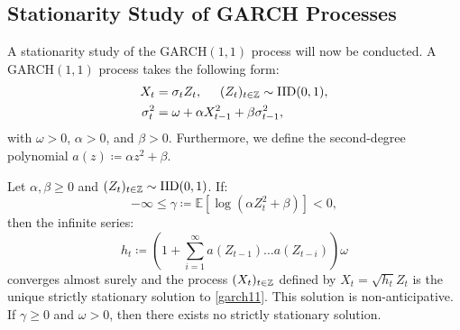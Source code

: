 \subsection{Stationarity Study of GARCH Processes}
A stationarity study of the GARCH$(1,1)$ process will now be conducted. A GARCH$(1,1)$ process takes the following form:
\begin{align}\label{garch11}
\begin{split}
    X_{t}& =\sigma_{t}Z_{t}, \hspace{14 pt} (Z_{t})_{t\in \mathbb{Z}}\sim \mathrm{IID}(0,1),\\
    \sigma_{t}^{2}& = \omega + \alpha X_{t-1}^{2}+\beta\sigma_{t-1}^{2},
\end{split}
\end{align}
with $\omega>0$, $\alpha>0$, and $\beta>0$. Furthermore, we define the second-degree polynomial $a(z)\coloneqq \alpha z^{2}+\beta$.
\begin{thm}\label{lortesatning}
Let $\alpha,\beta\geq 0$ and $(Z_{t})_{t\in \mathbb{Z}}\sim \mathrm{IID}(0,1)$. If:
\begin{equation}
    -\infty\leq \gamma\coloneqq\mathbb{E}\left[\log(\alpha Z_{t}^{2}+\beta)\right]<0,
\end{equation}
then the infinite series:
\begin{equation}\label{sumsumsum}
    h_{t}\coloneqq\left(1+\sum_{i=1}^{\infty}a(Z_{t-1})\dots a(Z_{t-i})\right)\omega
\end{equation}
converges almost surely and the process $(X_{t})_{t\in\mathbb{Z}}$ defined by $X_{t}=\sqrt{h_{t}}Z_{t}$ is the unique strictly stationary solution to \eqref{garch11}. This solution is non-anticipative. If $\gamma\geq 0$ and $\omega >0$, then there exists no strictly stationary solution. 
\end{thm}
